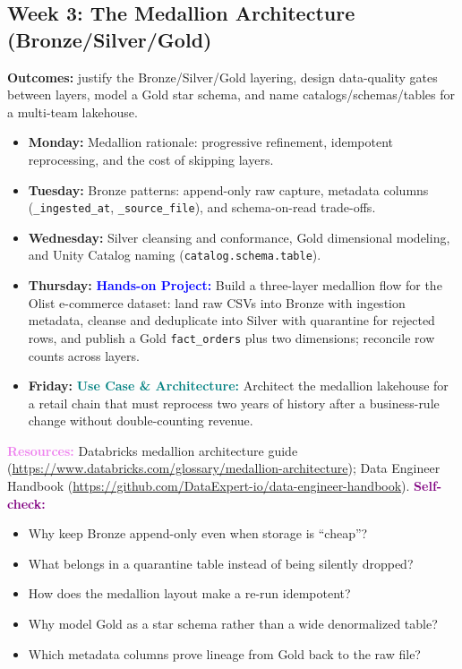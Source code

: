 \documentclass[11pt, a4paper]{article}
\newcommand{\project}[1]{\vspace{1mm}\noindent\textbf{\textcolor{blue}{Hands-on Project:}} #1}
\newcommand{\usecase}[1]{\vspace{1mm}\noindent\textbf{\textcolor{teal}{Use Case \& Architecture:}} #1}
\newcommand{\dayitem}[2]{\item \textbf{#1:} #2}
\newcommand{\resources}[1]{\vspace{1mm}\noindent\textbf{\textcolor{violet}{Resources:}} #1}
\newcommand{\selfcheck}[1]{\vspace{1mm}\noindent\textbf{\textcolor{purple}{Self-check:}} #1}
\begin{document}
\subsection*{Week 3: The Medallion Architecture (Bronze/Silver/Gold)}
\par\noindent\textbf{Outcomes:} justify the Bronze/Silver/Gold layering, design data-quality gates between layers, model a Gold star schema, and name catalogs/schemas/tables for a multi-team lakehouse.
\begin{itemize}[label=-]
    \dayitem{Monday}{Medallion rationale: progressive refinement, idempotent reprocessing, and the cost of skipping layers.}
    \dayitem{Tuesday}{Bronze patterns: append-only raw capture, metadata columns (\texttt{\_ingested\_at}, \texttt{\_source\_file}), and schema-on-read trade-offs.}
    \dayitem{Wednesday}{Silver cleansing and conformance, Gold dimensional modeling, and Unity Catalog naming (\texttt{catalog.schema.table}).}
    \dayitem{Thursday}{\project{Build a three-layer medallion flow for the Olist e-commerce dataset: land raw CSVs into Bronze with ingestion metadata, cleanse and deduplicate into Silver with quarantine for rejected rows, and publish a Gold \texttt{fact\_orders} plus two dimensions; reconcile row counts across layers.}}
    \dayitem{Friday}{\usecase{Architect the medallion lakehouse for a retail chain that must reprocess two years of history after a business-rule change without double-counting revenue.}}
\end{itemize}
\resources{Databricks medallion architecture guide (\url{https://www.databricks.com/glossary/medallion-architecture}); Data Engineer Handbook (\url{https://github.com/DataExpert-io/data-engineer-handbook}).}
\selfcheck{\begin{itemize}[label=-, leftmargin=1.5em, itemsep=0pt]
    \item Why keep Bronze append-only even when storage is ``cheap''?
    \item What belongs in a quarantine table instead of being silently dropped?
    \item How does the medallion layout make a re-run idempotent?
    \item Why model Gold as a star schema rather than a wide denormalized table?
    \item Which metadata columns prove lineage from Gold back to the raw file?
\end{itemize}}
\end{document}
